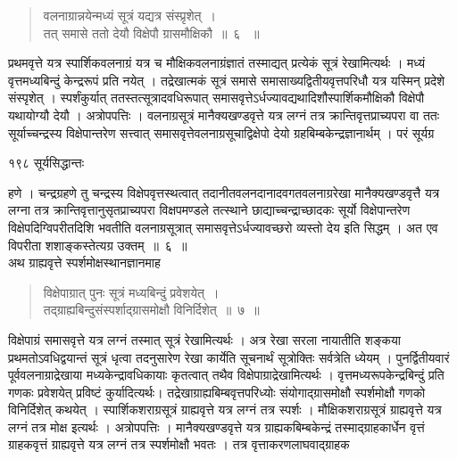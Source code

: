 \documentclass[11pt, openany]{book}
\begin{document}

\begin{quote}
{\ssi वलनाग्रान्नयेन्मध्यं सूत्रं यद्यत्र संस्प्रृशेत्~।\\
 तत् समासे ततो देयौ विक्षेपौ ग्रासमौक्षिकौ~॥~६ ~॥}
\end{quote}


 प्रथमवृत्ते यत्र स्पार्शिकवलनाग्रं यत्र च मौक्षिकवलनाग्रंज्ञातं तस्माद्यत् प्रत्येकं सूत्रं रेखामित्यर्थः । मध्यं वृत्तमध्यबिन्दुं केन्द्ररूपं प्रति नयेत् । तद्रेखात्मकं सूत्रं समासे समासाख्यद्वितीयवृत्तपरिधौ यत्र यस्मिन् प्रदेशे संस्पृशेत् । स्पर्शंकुर्यात् ततस्तत्सूत्रादवधिरूपात् समासवृत्तेऽर्धज्यावद्यथादिशौस्पार्शिकमौक्षिकौ विक्षेपौ यथायोग्यौ देयौ । अत्रोपपत्तिः । वलनाग्रसूत्रं मानैक्यखण्डवृत्ते यत्र लग्नं तत्र क्रान्तिवृत्तप्राच्यपरा वा ततः सूर्याच्चन्द्रस्य विक्षेपान्तरेण सत्त्वात् समासवृत्तेवलनाग्रसूचाद्विक्षेपो देयो ग्रहबिम्बकेन्द्रज्ञानार्थम् । परं सूर्यग्र\textendash


\newpage

\noindent १९८ \hspace{3.5cm} सूर्यसिद्धान्तः
\vspace{1cm}


\noindent हणे । चन्द्रग्रहणे तु चन्द्रस्य विक्षेपवृत्तस्थत्वात् तदानीतवलनदानादवगतवलनाग्ररेखा मानैक्यखण्डवृत्तै यत्र लग्ना तत्र क्रान्तिवृत्तानुसृतप्राच्यपरा विक्षपमण्डले तत्स्थाने छाद्याच्चन्द्राच्छादकः सूर्यो विक्षेपान्तरेण विक्षेपदिग्विपरीतदिशि भवतीति वलनाग्रसूत्रात् समासवृत्तेऽर्धज्यावच्छरो व्यस्तो देय इति सिद्धम् । अत एव विपरीता शशाङ्कस्तेत्यग्र उक्तम्~॥~६~॥\\
\noindent अथ ग्राह्यवृत्ते स्पर्शमोक्षस्थानज्ञानमाह\textendash



\begin{quote}
{\ssi विक्षेपाग्रात् पुनः सूत्रं मध्यबिन्दुं प्रवेशयेत्~।\\
 तद्ग्राह्यबिन्दुसंस्पर्शाद्ग्रासमोक्षौ विनिर्दिशेत्~॥~७~॥}
\end{quote}


 विक्षेपाग्रं समासवृत्ते यत्र लग्नं तस्मात् सूत्रं रेखामित्यर्थः । अत्र रेखा सरला नायातीति शङ्कया प्रथमतोऽवधिद्वयान्तं सूत्रं धृत्वा तदनुसारेण रेखा कार्येति सूचनार्थं सूत्रोक्तिः सर्वत्रेति ध्येयम् । पुनर्द्वितीयवारं पूर्ववलनाग्राद्रेखाया मध्यकेन्द्रावधिकायाः कृतत्वात् तथैव विक्षेपाग्राद्रेखामित्यर्थः । वृत्तमध्यरूपकेन्द्रबिन्दुं प्रति गणकः प्रवेशयेत् प्रविष्टं कुर्यादित्यर्थः। तद्रेखाग्राह्यबिम्बवृत्तपरिध्योः संयोगाद्ग्रासमोक्षौ स्पर्शमोक्षौ गणको विनिर्दिशेत् कथयेत् । स्पार्शिकशराग्रसूत्रं ग्राह्यवृत्ते यत्र लग्नं तत्र स्पर्शः । मौक्षिकशराग्रसूत्रं ग्राह्यवृत्ते यत्र लग्नं तत्र मोक्ष इत्यर्थः । अत्रोपपत्तिः । मानैक्यखण्डवृत्ते यत्र ग्राह्यकबिम्बकेन्द्रं तस्माद्ग्राहकार्धेन वृत्तं ग्राहकवृत्तं ग्राह्यवृत्ते यत्र लग्नं तत्र स्पर्शमोक्षौ भवतः । तत्र वृत्ताकरणलाघवाद्ग्राहक\textendash
\end{document}
